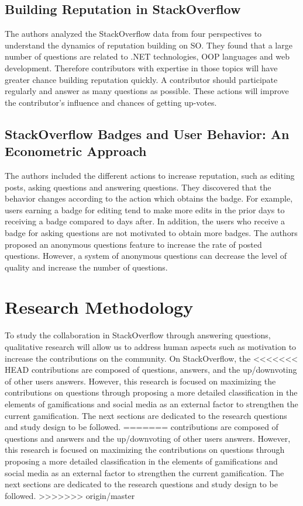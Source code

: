 \documentclass{sigchi}
\begin{document}
\subsection{Building Reputation in StackOverflow}

The authors analyzed the StackOverflow data from four perspectives to
understand the dynamics of reputation building on SO. They found that a large
number of questions are related to .NET technologies, OOP languages and web
development. Therefore contributors with expertise in those topics will have
greater chance building reputation quickly. A contributor should participate
regularly and answer as many questions as possible. These actions will improve
the contributor’s influence and chances of getting up-votes.

\subsection{StackOverflow Badges and User Behavior: An Econometric Approach}

The authors included the different actions to increase reputation, such as
editing posts, asking questions and answering questions. They discovered that
the behavior changes according to the action which obtains the badge. For example,
users earning a badge for editing tend to make more edits in the prior days to
receiving a badge compared to days after. In addition, the users who receive a
badge for asking questions are not motivated to obtain more badges. The authors
proposed an anonymous questions feature to increase the rate of posted questions.
However, a system of anonymous questions can decrease the level of quality and
increase the number of questions.


\section{Research Methodology}
To study the collaboration in StackOverflow through answering questions,
qualitative research will allow us to address human aspects such as motivation
to increase the contributions on the community. On StackOverflow, the
<<<<<<< HEAD
contributions are composed of questions, answers, and the up/downvoting of other 
users answers. However, this research is focused on maximizing the contributions 
on questions through proposing a more detailed classification in the elements of 
gamifications and social media as an external factor to strengthen the current 
gamification. The next sections are dedicated to the research questions and study 
design to be followed.
=======
contributions are composed of questions and answers and the up/downvoting of
other users answers. However, this research is
focused on maximizing the contributions on questions through proposing a more
detailed classification in the elements of gamifications and social media as an
external factor to strengthen the current gamification. The next sections are
dedicated to the research questions and study design to be followed.
>>>>>>> origin/master
\end{document}
